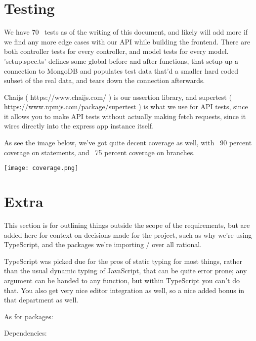 \documentclass[12pt]{article}
\begin{document}
\section{Testing}

We have 70~ tests as of the writing of this document, and likely will add more if we find any more edge cases with our API while building the frontend.  There are both controller tests for every controller, and model tests for every model.  'setup.spec.ts' defines some global before and after functions, that setup up a connection to MongoDB and populates test data that'd a smaller hard coded subset of the real data, and tears down the connection afterwards.

Chaijs ( https://www.chaijs.com/ ) is our assertion library, and supertest ( https://www.npmjs.com/package/supertest ) is what we use for API tests, since it allows you to make API tests without actually making fetch requests, since it wires directly into the express app instance itself.

As see the image below, we've got quite decent coverage as well, with ~90 percent coverage on statements, and ~75 percent coverage on branches.


\texttt{[image: coverage.png]}

\section{Extra}

This section is for outlining things outside the scope of the requirements, but are added here for context on decisions made for the project, such as why we're using TypeScript, and the packages we're importing / over all rational.

TypeScript was picked due for the pros of static typing for most things, rather than the usual dynamic typing of JavaScript, that can be quite error prone; any argument can be handed to any function, but within TypeScript you can't do that.  You also get very nice editor integration as well, so a nice added bonus in that department as well.

As for packages:

Dependencies:
\end{document}
